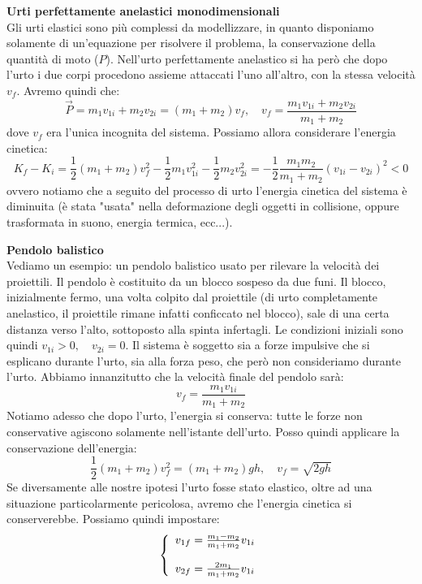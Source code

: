 \documentclass[a4paper,12pt]{article}
\begin{document}
\textbf{Urti perfettamente anelastici monodimensionali} \\
Gli urti elastici sono più complessi da modellizzare, in quanto disponiamo solamente di un'equazione per
risolvere il problema, la conservazione della quantità di moto ($P$). Nell'urto perfettamente anelastico
si ha però che dopo l'urto i due corpi procedono assieme attaccati l'uno all'altro, con la stessa velocità $v_f$.
Avremo quindi che:
$$ \vec{P} = m_1v_{1i} + m_2v_{2i} = (m_1 + m_2)v_f, \quad v_f = \frac{m_1v_{1i} + m_2v_{2i}}{m_1+m_2}$$
dove $v_f$ era l'unica incognita del sistema. Possiamo allora considerare l'energia cinetica:
$$ K_f - K_i = \frac{1}{2}(m_1 + m_2) v_f^2 - \frac{1}{2}m_1v_{1i}^2 - \frac{1}{2}m_2v_{2i}^2 = -\frac{1}{2}\frac{m_1m_2}{m_1+m_2}(v_{1i} - v_{2i})^2<0 $$
ovvero notiamo che a seguito del processo di urto l'energia cinetica del sistema è diminuita (è stata "usata" nella deformazione
degli oggetti in collisione, oppure trasformata in suono, energia termica, ecc...).
\par\smallskip
\textbf{Pendolo balistico} \\
Vediamo un esempio: un pendolo balistico usato per rilevare la velocità dei proiettili. Il pendolo è costituito da un blocco sospeso
da due funi. Il blocco, inizialmente fermo, una volta colpito dal proiettile (di urto completamente anelastico, il proiettile rimane infatti conficcato nel blocco),
sale di una certa distanza verso l'alto, sottoposto alla spinta infertagli. Le condizioni iniziali sono quindi
$v_{1i} > 0, \quad v_{2i} = 0$. Il sistema è soggetto sia a forze impulsive
che si esplicano durante l'urto, sia alla forza peso, che però non consideriamo durante l'urto. Abbiamo innanzitutto
che la velocità finale del pendolo sarà:
$$ v_f = \frac{m_1v_{1i}}{m_1+m_2} $$
Notiamo adesso che dopo l'urto, l'energia si conserva: tutte le forze non conservative agiscono solamente nell'istante
dell'urto. Posso quindi applicare la conservazione dell'energia:
$$ \frac{1}{2}(m_1+m_2)v_f^2 = (m_1+m_2)gh, \quad v_f = \sqrt{2gh} $$
Se diversamente alle nostre ipotesi l'urto fosse stato elastico, oltre ad una situazione particolarmente pericolosa, avremo
che l'energia cinetica si conserverebbe. Possiamo quindi impostare:
$$ 
\left\{\begin{array}{l}
    v_{1f} = \frac{m_1-m_2}{m_1+m_2}v_{1i} \cr \\
    v_{2f} = \frac{2m_1}{m_1+m_2}v_{1i}
\end{array}\right.
$$
\end{document}
